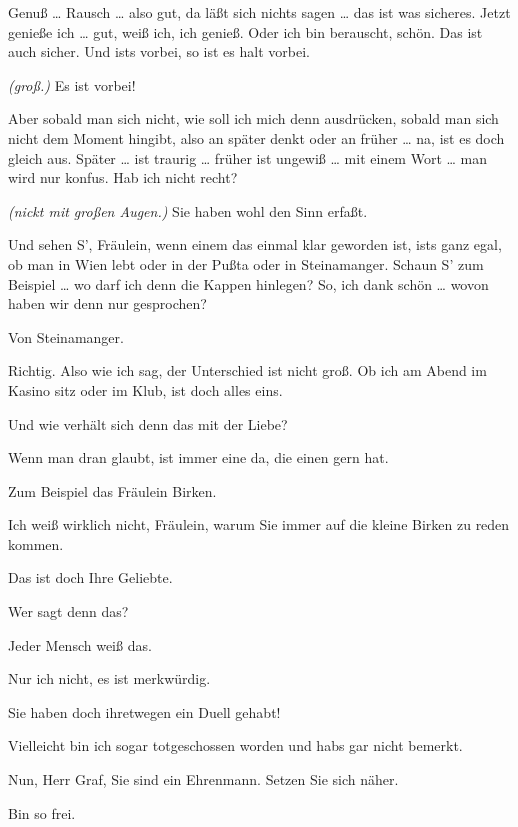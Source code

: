 \documentclass[
	final,
	a4paper,
	ngerman,
	mpinclude = true, %
	twoside = true,
	open = right,
	cleardoublepage = plain,
	DIV = 13,
	BCOR = 1cm,
	titlepage = firstiscover,
	]{scrbook}
\newcommand{\direction}[1]{\textit{(#1)}}
\newcommand{\thecharacter}[1]{\textup{\textsc{#1}}\xspace}
\newcommand{\theschauspielerin}{\thecharacter{Schauspielerin}}
\newcommand{\thegraf}{\thecharacter{Graf}}
\newcommand{\character}[1]{\item[#1:]}
\newcommand{\schauspielerin}{\character{\theschauspielerin}}
\newcommand{\graf}{\character{\thegraf}}
\begin{document}
\begin{play}
	\graf
	Genuß \ldots{} Rausch \ldots{} also gut, da läßt sich nichts sagen \ldots{} das ist was sicheres. Jetzt genieße ich \ldots{} gut, weiß ich, ich genieß. Oder ich bin berauscht, schön. Das ist auch sicher. Und ists vorbei, so ist es halt vorbei.

	\schauspielerin
	\direction{groß.} Es ist vorbei!

	\graf
	Aber sobald man sich nicht, wie soll ich mich denn ausdrücken, sobald man sich nicht dem Moment hingibt, also an später denkt oder an früher \ldots{} na, ist es doch gleich aus. Später \ldots{} ist traurig \ldots{} früher ist ungewiß \ldots{} mit einem Wort \ldots{} man wird nur konfus. Hab ich nicht recht?

	\schauspielerin
	\direction{nickt mit großen Augen.} Sie haben wohl den Sinn erfaßt.

	\graf
	Und sehen S', Fräulein, wenn einem das einmal klar geworden ist, ists ganz egal, ob man in Wien lebt oder in der Pußta oder in Steinamanger. Schaun S' zum Beispiel \ldots{} wo darf ich denn die Kappen hinlegen? So, ich dank schön \ldots{} wovon haben wir denn nur gesprochen?

	\schauspielerin
	Von Steinamanger.

	\graf
	Richtig. Also wie ich sag, der Unterschied ist nicht groß. Ob ich am Abend im Kasino sitz oder im Klub, ist doch alles eins.

	\schauspielerin
	Und wie verhält sich denn das mit der Liebe?

	\graf
	Wenn man dran glaubt, ist immer eine da, die einen gern hat.

	\schauspielerin
	Zum Beispiel das Fräulein Birken.

	\graf
	Ich weiß wirklich nicht, Fräulein, warum Sie immer auf die kleine Birken zu reden kommen.

	\schauspielerin
	Das ist doch Ihre Geliebte.

	\graf
	Wer sagt denn das?

	\schauspielerin
	Jeder Mensch weiß das.

	\graf
	Nur ich nicht, es ist merkwürdig.

	\schauspielerin
	Sie haben doch ihretwegen ein Duell gehabt!

	\graf
	Vielleicht bin ich sogar totgeschossen worden und habs gar nicht bemerkt.

	\schauspielerin
	Nun, Herr Graf, Sie sind ein Ehrenmann. Setzen Sie sich näher.

	\graf
	Bin so frei.


\end{play}
\end{document}
